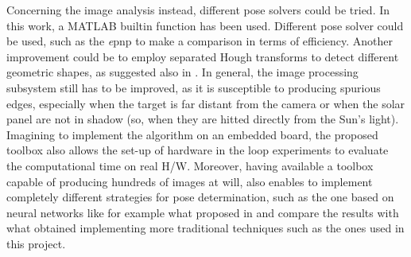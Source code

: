 Concerning the image analysis instead, different pose solvers could be tried. In this work, a MATLAB builtin function has been used. Different pose solver could be used, such as the \textit{e}\acrshort{pnp} \cite{10.1007/s11263-008-0152-6} to make a comparison in terms of efficiency. Another improvement could be to employ separated Hough transforms to detect different geometric shapes, as suggested also in \cite{Sharma2018}. In general, the image processing subsystem still has to be improved, as it is susceptible to producing spurious edges, especially when the target is far distant from the camera or when the solar panel are not in shadow (so, when they are hitted directly from the Sun's light).
Imagining to implement the algorithm on an embedded board, the proposed toolbox also allows the set-up of hardware in the loop experiments to evaluate the computational time on real H/W.
Moreover, having available a toolbox capable of producing hundreds of images at will, also enables to implement completely different strategies for pose determination, such as the one based on neural networks like for example what proposed in \cite{Sharma2019} and compare the results with what obtained implementing more traditional techniques such as the ones used in this project.